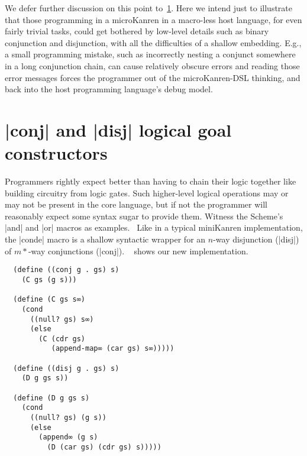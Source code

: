 \documentclass[sigplan,screen,draft,anonymous,review,natbib=false]{acmart}
\begin{document}
We defer further discussion on this point to~\cref{sec:conde}. Here we
intend just to illustrate that those programming in a microKanren in a
macro-less host language, for even fairly trivial tasks, could get
bothered by low-level details such as binary conjunction and
disjunction, with all the difficulties of a shallow embedding. E.g., a
small programming mistake, such as incorrectly nesting a conjunct
somewhere in a long conjunction chain, can cause relatively obscure
errors and reading those error messages forces the programmer out of
the microKanren-DSL thinking, and back into the host programming
language's debug model.

\section{\rackinline|conj| and \rackinline|disj| logical goal
  constructors}\label{sec:conde}

Programmers rightly expect better than having to chain their logic
together like building circuitry from logic gates. Such higher-level
logical operations may or may not be present in the core language, but
if not the programmer will reasonably expect some syntax sugar to
provide them. Witness the Scheme's \rackinline|and| and
\rackinline|or| macros as examples.~\cite{shinn2013revisedreport} Like
in a typical miniKanren implementation, the \rackinline|conde| macro
is a shallow syntactic wrapper for an $n$-way disjunction
(\rackinline|disj|) of $m*$-way conjunctions (\rackinline|conj|).
~ shows our new
implementation.


\begin{listing}
  \begin{verbatim}
  (define ((conj g . gs) s)
    (C gs (g s)))

  (define (C gs s∞)
    (cond
      ((null? gs) s∞)
      (else
        (C (cdr gs)
           (append-map∞ (car gs) s∞)))))

  (define ((disj g . gs) s)
    (D g gs s))

  (define (D g gs s)
    (cond
      ((null? gs) (g s))
      (else
        (append∞ (g s)
          (D (car gs) (cdr gs) s)))))
  \end{verbatim}
  \caption{Re-implementations of \rackinline|conj| and \rackinline|disj|.}
  \label{mnt:conj-and-disj-reimplementation}
\end{listing}
\end{document}
